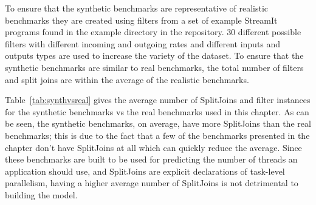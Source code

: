To ensure that the synthetic benchmarks are representative of realistic benchmarks they are created using filters from a set of example StreamIt programs found in the example directory in the repository.
30 different possible filters with different incoming and outgoing rates and different inputs and outputs types are used to increase the variety of the dataset.
To ensure that the synthetic benchmarks are similar to real benchmarks, the total number of filters and split joins are within the average of the realistic benchmarks.

Table~\ref{tab:synthvsreal} gives the average number of SplitJoins and filter instances for the synthetic benchmarks vs the real benchmarks used in this chapter.
As can be seen, the synthetic benchmarks, on average, have more SplitJoins than the real benchmarks; this is due to the fact that a few of the benchmarks presented in the chapter don't have SplitJoins at all which can quickly reduce the average.
Since these benchmarks are built to be used for predicting the number of threads an application should use, and SplitJoins are explicit declarations of task-level parallelism, having a higher average number of SplitJoins is not detrimental to building the model.
